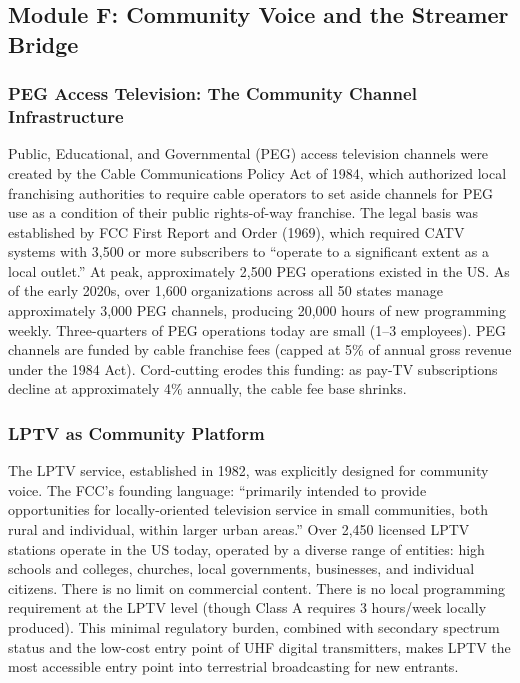 \documentclass[11pt,letterpaper]{article}
\begin{document}
\subsection{Module F: Community Voice and the Streamer Bridge}

\subsubsection{PEG Access Television: The Community Channel Infrastructure}

Public, Educational, and Governmental (PEG) access television channels were created by the Cable Communications Policy Act of 1984, which authorized local franchising authorities to require cable operators to set aside channels for PEG use as a condition of their public rights-of-way franchise. The legal basis was established by FCC First Report and Order (1969), which required CATV systems with 3,500 or more subscribers to ``operate to a significant extent as a local outlet.'' At peak, approximately 2,500 PEG operations existed in the US. As of the early 2020s, over 1,600 organizations across all 50 states manage approximately 3,000 PEG channels, producing 20,000 hours of new programming weekly. Three-quarters of PEG operations today are small (1--3 employees). PEG channels are funded by cable franchise fees (capped at 5\% of annual gross revenue under the 1984 Act). Cord-cutting erodes this funding: as pay-TV subscriptions decline at approximately 4\% annually, the cable fee base shrinks.

\subsubsection{LPTV as Community Platform}

The LPTV service, established in 1982, was explicitly designed for community voice. The FCC's founding language: ``primarily intended to provide opportunities for locally-oriented television service in small communities, both rural and individual, within larger urban areas.'' Over 2,450 licensed LPTV stations operate in the US today, operated by a diverse range of entities: high schools and colleges, churches, local governments, businesses, and individual citizens. There is no limit on commercial content. There is no local programming requirement at the LPTV level (though Class A requires 3 hours/week locally produced). This minimal regulatory burden, combined with secondary spectrum status and the low-cost entry point of UHF digital transmitters, makes LPTV the most accessible entry point into terrestrial broadcasting for new entrants.
\end{document}
